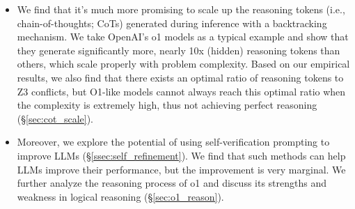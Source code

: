 \begin{itemize}[leftmargin=*,itemsep=0pt,parsep=0pt,topsep=0pt,partopsep=0pt]
    \item We find that it's much more promising to scale up the reasoning tokens (i.e., chain-of-thoughts; CoTs) generated during inference with a backtracking mechanism. 
    We take OpenAI's o1 models as a typical example and show that they generate significantly more, nearly 10x (hidden) reasoning tokens than others, which scale properly  with problem complexity.
    Based on our empirical results, we also find that there exists an optimal ratio of reasoning tokens to Z3 conflicts, but O1-like models cannot always reach this optimal ratio when the complexity is extremely high, thus not achieving perfect reasoning (\S\ref{sec:cot_scale}).
    
    \item Moreover, we explore the potential of using self-verification prompting to improve LLMs (\S\ref{ssec:self_refinement}). We find that such methods can help LLMs improve their performance, but the improvement is very marginal. We further analyze the reasoning process of o1 and discuss its strengths and weakness in logical reasoning (\S\ref{sec:o1_reason}).
 
\end{itemize}




 

    
